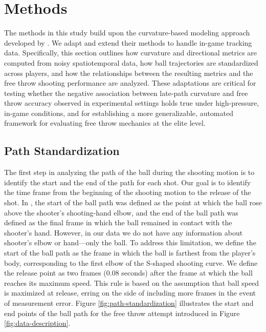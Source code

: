 \documentclass{article}
\begin{document}
  \section{Methods}
  
    The methods in this study build upon the curvature-based modeling approach developed by \citet{slegers_role_2024}. We adapt and extend their methods to handle in-game tracking data. Specifically, this section outlines how curvature and directional metrics are computed from noisy spatiotemporal data, how ball trajectories are standardized across players, and how the relationships between the resulting metrics and the free throw shooting performance are analyzed. These adaptations are critical for testing whether the negative association between late-path curvature and free throw accuracy observed in experimental settings holds true under high-pressure, in-game conditions, and for establishing a more generalizable, automated framework for evaluating free throw mechanics at the elite level.

    \subsection{Path Standardization}

      The first step in analyzing the path of the ball during the shooting motion is to identify the start and the end of the path for each shot. Our goal is to identify the time frame from the beginning of the shooting motion to the release of the shot. In \citep{slegers_role_2024}, the start of the ball path was defined as the point at which the ball rose above the shooter's shooting-hand elbow, and the end of the ball path was defined as the final frame in which the ball remained in contact with the shooter's hand. However, in our data we do not have any information about shooter's elbow or hand---only the ball. To address this limitation, we define the start of the ball path as the frame in which the ball is farthest from the player's body, corresponding to the first elbow of the S-shaped shooting curve. We define the release point as two frames (0.08 seconds) after the frame at which the ball reaches its maximum speed. This rule is based on the assumption that ball speed is maximized at release, erring on the side of including more frames in the event of measurement error. Figure \ref{fig:path-standardization} illustrates the start and end points of the ball path for the free throw attempt introduced in Figure \ref{fig:data-description}.
\end{document}

